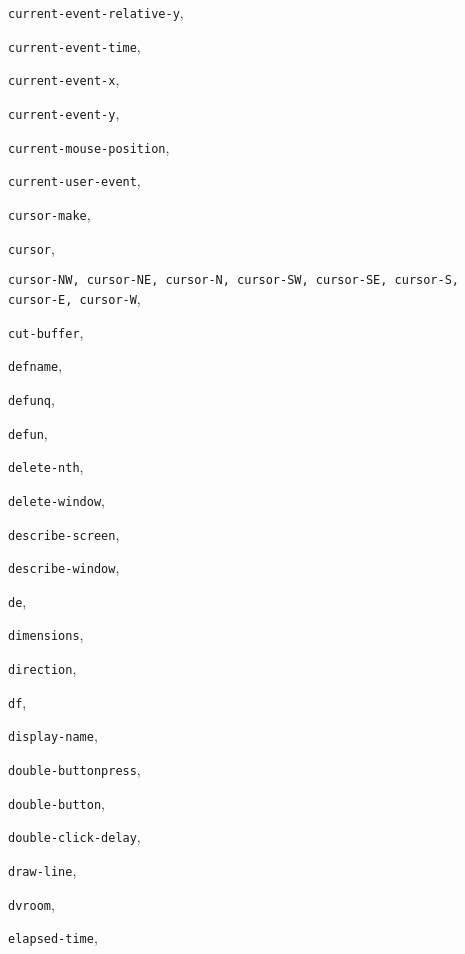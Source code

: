 \begin{theindex}
\item {\tt current-event-relative-y}, {\bf\pageref{current-event-relative-y}}
\item {\tt current-event-time}, {\bf\pageref{current-event-time}}
\item {\tt current-event-x}, {\bf\pageref{current-event-x}}
\item {\tt current-event-y}, {\bf\pageref{current-event-y}}
\item {\tt current-mouse-position}, {\bf\pageref{current-mouse-position}}
\item {\tt current-user-event}, {\bf\pageref{current-user-event}}
\item {\tt cursor-make}, {\bf\pageref{cursor-make}}
\item {\tt cursor}, {\bf\pageref{cursor}}
\item {\tt cursor-NW, cursor-NE, cursor-N, cursor-SW, cursor-SE, cursor-S,
cursor-E, cursor-W}, {\bf\pageref{cursor-NW}}
\item {\tt cut-buffer}, {\bf\pageref{cut-buffer}}
\item {\tt defname}, {\bf\pageref{defname}}
\item {\tt defunq}, {\bf\pageref{defunq}}
\item {\tt defun}, {\bf\pageref{defun}}
\item {\tt delete-nth}, {\bf\pageref{delete-nth}}
\item {\tt delete-window}, {\bf\pageref{delete-window}}
\item {\tt describe-screen}, {\bf\pageref{describe-screen}}
\item {\tt describe-window}, {\bf\pageref{describe-window}}
\item {\tt de}, {\bf\pageref{de}}
\item {\tt dimensions}, {\bf\pageref{dimensions}}
\item {\tt direction}, {\bf\pageref{direction}}
\item {\tt df}, {\bf\pageref{df}}
\item {\tt display-name}, {\bf\pageref{display-name}}
\item {\tt double-buttonpress}, {\bf\pageref{double-buttonpress}}
\item {\tt double-button}, {\bf\pageref{double-button}}
\item {\tt double-click-delay}, {\bf\pageref{double-click-delay}}
\item {\tt draw-line}, {\bf\pageref{draw-line}}
\item {\tt dvroom}, {\bf\pageref{dvroom}}
\item {\tt elapsed-time}, {\bf\pageref{elapsed-time}}

\end{theindex}
